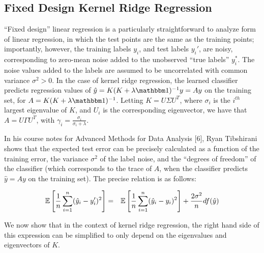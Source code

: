 \documentclass[12pt]{article}
\newcommand{\hy}{\hat{y}}
\begin{document}
\subsection{Fixed Design Kernel Ridge Regression}
``Fixed design'' linear regression is a particularly straightforward to analyze form of linear regression, in which the test points are the same as the training points; importantly, however, the training labels $y_i$, and test labels $y_i'$, are noisy, corresponding to zero-mean noise added to the unobserved ``true labels'' $y_i^*$. The noise values added to the labels are assumed to be uncorrelated with common variance $\sigma^2 > 0$.  In the case of kernel ridge regression, the learned classifier predicts regression values of $\hy = K(K+\lambda\id)^{-1}y = Ay$ on the training set, for $A=K(K+\lambda\id)^{-1}$.  Letting $K=U\Sigma U^T$, where $\sigma_i$ is the $i^{th}$ largest eigenvalue of $K$, and $U_i$ is the corresponding eigenvector, we have that $A = U\Gamma U^T$, with $\gamma_i = \frac{\sigma_i}{\sigma_i + \lambda}$.

In his course notes for Advanced Methods for Data Analysis [6], Ryan Tibshirani shows that the expected test error can be precisely calculated as a function of the training error, the variance $\sigma^2$ of the label noise, and the ``degrees of freedom'' of the classifier (which corresponds to the trace of $A$, when the classifier predicts $\hy = Ay$ on the training set).  The precise relation is as follows:

\begin{eqnarray*}
	\expect{}{\frac{1}{n}\sum_{i=1}^n (\hy_i - y_i')^2} &=& \expect{}{\frac{1}{n}\sum_{i=1}^n (\hy_i - y_i)^2} + \frac{2\sigma^2}{n}df(\hy)\\
\end{eqnarray*}

We now show that in the context of kernel ridge regression, the right hand side of this expression can be simplified to only depend on the eigenvalues and eigenvectors of $K$.
\end{document}
